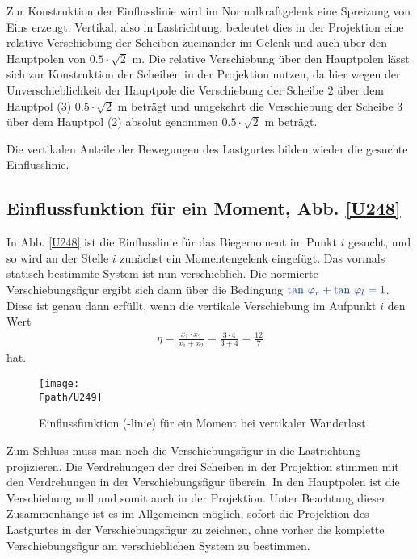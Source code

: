 Zur Konstruktion der Einflusslinie wird im Normalkraftgelenk eine Spreizung von Eins erzeugt. Vertikal, also in Lastrichtung, bedeutet dies in der Projektion eine relative Verschiebung der Scheiben zueinander im Gelenk und auch \"{u}ber den Hauptpolen von $0.5\cdot\sqrt{2}$ m. Die relative Verschiebung \"{u}ber den Hauptpolen l\"{a}sst sich zur Konstruktion der Scheiben in der Projektion nutzen, da hier wegen der Unverschieblichkeit der Hauptpole die Verschiebung der Scheibe $2$ \"{u}ber dem Hauptpol (3)  $0.5 \cdot \sqrt{2}$ m betr\"{a}gt und umgekehrt die Verschiebung der Scheibe $3$ \"{u}ber dem Hauptpol (2) absolut genommen $0.5 \cdot \sqrt{2}$ m betr\"{a}gt.


Die vertikalen Anteile der Bewegungen des Lastgurtes bilden wieder die gesuchte Einfluss\-linie.


{\textcolor{sectionTitleBlue}{\subsection{Einflussfunktion f\"{u}r ein Moment, Abb. \ref{U248}}}}

In Abb. \ref{U248} ist die Einflusslinie f\"{u}r das Biegemoment im Punkt $i$ gesucht, und so wird an der Stelle $i$ zun\"{a}chst ein Momentengelenk eingef\"{u}gt. Das vormals statisch bestimmte System ist nun verschieblich. Die normierte Verschiebungsfigur ergibt sich dann \"{u}ber die Bedingung $\textcolor{chapterTitleBlue}{\tan\,\Np_r +\tan\,\Np_l=1}$. Diese ist genau dann erf\"{u}llt, wenn die vertikale Verschiebung im Aufpunkt $i$ den Wert
\begin{align}
\eta=\frac{ x_1\cdot x_2 }{ x_1+x_2}=\frac{ 3\cdot 4 }{ 3+4}=\frac{ 12 }{7}
\end{align}
hat.
\begin{figure}[tbp]
\centering
\if {} \sidecaption \fi
\texttt{[image: \\Fpath/U249]}
\caption{Einflussfunktion (-linie) f\"{u}r ein Moment bei vertikaler Wanderlast} \label{U249}
\end{figure}%

Zum Schluss muss man noch die Verschiebungsfigur in die Lastrichtung projizieren. Die Verdrehungen der drei Scheiben in der Projektion stimmen mit den Verdrehungen in der Verschiebungsfigur \"{u}berein. In den Hauptpolen ist die Verschiebung null und somit auch in der Projektion. Unter Beachtung dieser Zusammenh\"{a}nge ist es im Allgemeinen m\"{o}glich, sofort die Projektion des Lastgurtes in der Verschiebungsfigur zu zeichnen, ohne vorher die komplette Verschiebungsfigur am verschieblichen System zu bestimmen.

